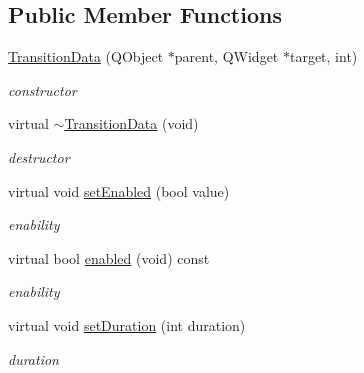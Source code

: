 \subsection*{Public Member Functions}
\begin{DoxyCompactItemize}
\item 
\mbox{\label{class_transition_data_a95943bd6514e01dfb21266673483a469}} 
\hyperlink{class_transition_data_a95943bd6514e01dfb21266673483a469}{Transition\+Data} (Q\+Object $\ast$parent, Q\+Widget $\ast$target, int)
\begin{DoxyCompactList}\small\item\em constructor \end{DoxyCompactList}\item 
\mbox{\label{class_transition_data_ac141a5e5880e99ff78ae755449b5c6d5}} 
virtual \hyperlink{class_transition_data_ac141a5e5880e99ff78ae755449b5c6d5}{$\sim$\+Transition\+Data} (void)
\begin{DoxyCompactList}\small\item\em destructor \end{DoxyCompactList}\item 
\mbox{\label{class_transition_data_afdf4933c381236940b4d83e23f7851ff}} 
virtual void \hyperlink{class_transition_data_afdf4933c381236940b4d83e23f7851ff}{set\+Enabled} (bool value)
\begin{DoxyCompactList}\small\item\em enability \end{DoxyCompactList}\item 
\mbox{\label{class_transition_data_a1efbac58255aecb0d015670919466428}} 
virtual bool \hyperlink{class_transition_data_a1efbac58255aecb0d015670919466428}{enabled} (void) const
\begin{DoxyCompactList}\small\item\em enability \end{DoxyCompactList}\item 
\mbox{\label{class_transition_data_a5da805809933bcfff33e31834397d904}} 
virtual void \hyperlink{class_transition_data_a5da805809933bcfff33e31834397d904}{set\+Duration} (int duration)
\begin{DoxyCompactList}\small\item\em duration \end{DoxyCompactList}\item 

\end{DoxyCompactItemize}
